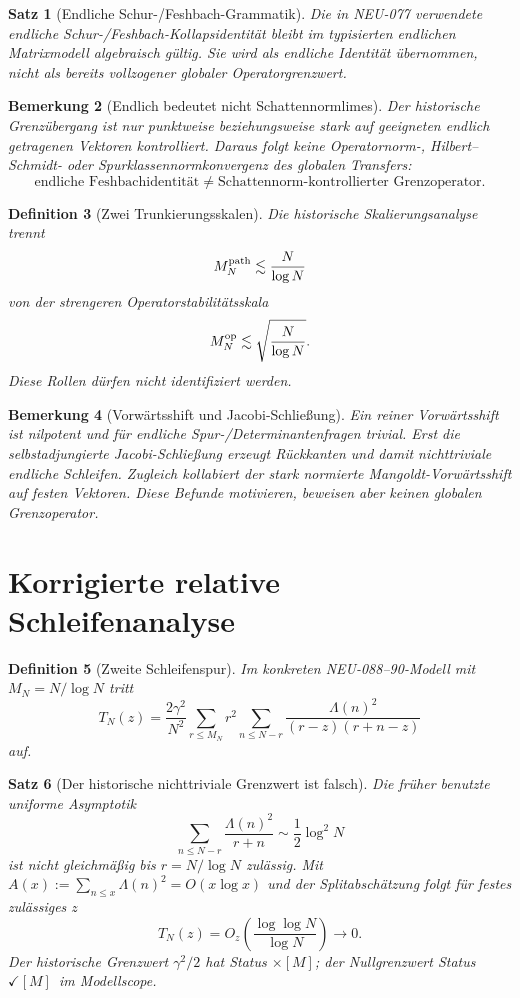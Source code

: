 \documentclass[11pt,a4paper]{amsart}
\newtheorem{theorem}{Satz}[section]
\newtheorem{definition}[theorem]{Definition}
\newtheorem{remark}[theorem]{Bemerkung}
\newcommand{\stM}{\ensuremath{\checkmark[M]}}
\begin{document}
\begin{theorem}[Endliche Schur-/Feshbach-Grammatik]\label{thm:finite-feshbach}
Die in NEU-077 verwendete endliche Schur-/Feshbach-Kollapsidentität bleibt im
typisierten endlichen Matrixmodell algebraisch gültig. Sie wird als endliche
Identität übernommen, nicht als bereits vollzogener globaler Operatorgrenzwert.
\end{theorem}

\begin{remark}[Endlich bedeutet nicht Schattennormlimes]\label{rem:finite-not-schatten}
Der historische Grenzübergang ist nur punktweise beziehungsweise stark auf
geeigneten endlich getragenen Vektoren kontrolliert. Daraus folgt keine
Operatornorm-, Hilbert--Schmidt- oder Spurklassennormkonvergenz des globalen
Transfers:
\[
\boxed{\text{endliche Feshbachidentität}\neq
\text{Schattennorm-kontrollierter Grenzoperator}.}
\]
\end{remark}

\begin{definition}[Zwei Trunkierungsskalen]\label{def:scales}
Die historische Skalierungsanalyse trennt
\[
M_N^{\rm path}\lesssim\frac{N}{\log N}
\]
von der strengeren Operatorstabilitätsskala
\[
M_N^{\rm op}\lesssim\sqrt{\frac{N}{\log N}}.
\]
Diese Rollen dürfen nicht identifiziert werden.
\end{definition}

\begin{remark}[Vorwärtsshift und Jacobi-Schließung]
Ein reiner Vorwärtsshift ist nilpotent und für endliche
Spur-/Determinantenfragen trivial. Erst die selbstadjungierte
Jacobi-Schließung erzeugt Rückkanten und damit nichttriviale endliche
Schleifen. Zugleich kollabiert der stark normierte Mangoldt-Vorwärtsshift auf
festen Vektoren. Diese Befunde motivieren, beweisen aber keinen globalen
Grenzoperator.
\end{remark}

\section{Korrigierte relative Schleifenanalyse}

\begin{definition}[Zweite Schleifenspur]\label{def:Tn}
Im konkreten NEU-088--90-Modell mit $M_N=N/\log N$ tritt
\[
T_N(z)=\frac{2\gamma^2}{N^2}
\sum_{r\le M_N}r^2\sum_{n\le N-r}
\frac{\Lambda(n)^2}{(r-z)(r+n-z)}
\]
auf.
\end{definition}

\begin{theorem}[Der historische nichttriviale Grenzwert ist falsch]\label{thm:Tn-zero}
Die früher benutzte uniforme Asymptotik
\[
\sum_{n\le N-r}\frac{\Lambda(n)^2}{r+n}\sim\frac12\log^2N
\]
ist nicht gleichmäßig bis $r=N/\log N$ zulässig. Mit
$A(x):=\sum_{n\le x}\Lambda(n)^2=O(x\log x)$ und der Splitabschätzung folgt
für festes zulässiges $z$
\[
\boxed{T_N(z)=O_z\!\left(\frac{\log\log N}{\log N}\right)\longrightarrow0.}
\]
Der historische Grenzwert $\gamma^2/2$ hat Status $\times[M]$; der
Nullgrenzwert Status \stM\ im Modellscope.
\end{theorem}
\end{document}

